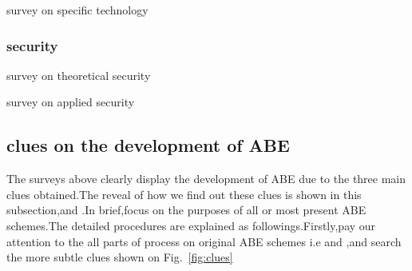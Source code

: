 survey on specific technology
\subsubsection{security}
survey on theoretical security

survey on applied security
\subsection{clues on the development of ABE}
The surveys above clearly display the development of ABE due to the three main clues obtained.The reveal of how we find out these clues is shown in this subsection,and .In brief,focus on the purposes of all or most present ABE schemes.The detailed procedures are explained as followings.Firstly,pay our attention to the all parts of process on original ABE schemes i.e\cite{classical:KP-ABE} and \cite{first:CP-ABE},and search the more subtle clues shown on Fig.~\ref{fig:clues}
